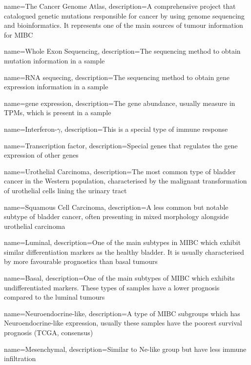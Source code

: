 {
    name=The Cancer Genome Atlas,
    description={A comprehensive project that catalogued genetic mutations responsible for cancer by using genome sequencing and bioinformatics. It represents one of the main sources of tumour information for MIBC}
}

{
    name=Whole Exon Sequencing,
    description={The sequencing method to obtain mutation information in a sample}
}

{
    name=RNA sequecing,
    description={The sequencing method to obtain gene expression information in a sample}
}

{
    name=gene expression,
    description={The gene abundance, usually measure in TPMs, which is present in a sample}
}

{
    name=Interferon-$\gamma$,
    description={This is a special type of immune response}
}

{
    name=Transcription factor,
    description={Special genes that regulates the gene expression of other genes}
}

{
    name=Urothelial Carcinoma,
    description={The most common type of bladder cancer in the Western population, characterised by the malignant transformation of urothelial cells lining the urinary tract}
}

{
    name=Squamous Cell Carcinoma,
    description={A less common but notable subtype of bladder cancer, often presenting in mixed morphology alongside urothelial carcinoma}
}


{
    name=Luminal,
    description={One of the main subtypes in MIBC which exhibit similar differentiation markers as the healthy bladder. It is usually characterised by more favourable prognostics than basal tumours}
}

{
    name=Basal,
    description={One of the main subtypes of MIBC which exhibits undifferentiated markers. These types of samples have a lower prognosis compared to the luminal tumours}
}



{
    name=Neuroendocrine-like,
    description={A type of MIBC subgroups which has Neuroendocrine-like expression, usually these samples have the poorest survival prognosis (TCGA, consensus)}
}

{
    name=Mesenchymal,
    description={Similar to Ne-like group but have less immune infiltration}
}

